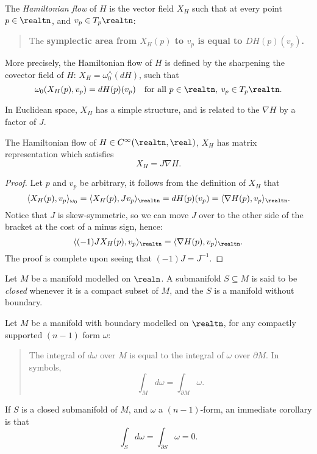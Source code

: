 \documentclass[../main-v2-manifolds.tex]{subfiles}
\begin{document}
\begin{definition}
    The \emph{Hamiltonian flow} of $H$ is the vector field $X_H$ such that at every point $p\in \realtn$, and $v_p\in T_p\realtn$:
    \begin{quote}
        The \textbf{symplectic area from $X_H(p)$ to $v_p$ is equal to $DH(p)(v_p)$.}
    \end{quote}
    More precisely, the Hamiltonian flow of $H$ is defined by the sharpening the covector field of $H$:  $X_H = \omega_0^{\wedge}(dH)$, such that
    \begin{equation}
        \omega_0(X_H(p), v_p) = dH(p)(v_p)\quad\text{for all }p\in \realtn,\: v_p\in T_p\realtn.
        \label{eq:hamiltonian flow definition symplectic pairing}
    \end{equation}
\end{definition}
In Euclidean space, $X_H$ has a simple structure, and is related to the $\nabla H$ by a factor of $J$. 
\begin{lemma}\label{lem:hvf in euclidean space formula}
    The Hamiltonian flow of $H\in C^\infty(\realtn,\real)$, $X_H$ has matrix representation which satisfies
    \begin{equation}
        X_H = J\nabla H.
        \label{eq: hvf in euclidean space formula}
    \end{equation}
\end{lemma}
\begin{proof}
    Let $p$ and $v_p$ be arbitrary, it follows from the definition of $X_H$ that
    \[
        \langle X_H(p), v_p\rangle_{\omega_0} = \langle X_H(p), Jv_p\rangle_{\realtn} = dH(p)(v_p) = \langle\nabla H(p), v_p\rangle_{\realtn}.
    \]
    Notice that $J$ is skew-symmetric, so we can move $J$ over to the other side of the bracket at the cost of a minus sign, hence:
    \[
        \langle (-1)J X_H(p), v_p\rangle_{\realtn} = \langle \nabla H(p),v_p\rangle_{\realtn}.
    \]
    The proof is complete upon seeing that $(-1)J=J^{-1}$.
\end{proof}
\begin{definition}\label{def:closed-submanifolds}
    Let $M$ be a manifold modelled on $\realn$. A submanifold $S\subseteq M$ is said to be \emph{closed} whenever it is a compact subset of $M$, and the $S$ is a manifold without boundary.
\end{definition}
\begin{remark}
    Let $M$ be a manifold with boundary modelled on $\realtn$, for any compactly supported $(n-1)$ form $\omega$:
    \begin{quote}
        The integral of $d\omega$ over $M$ is equal to the integral of $\omega$ over $\partial M$. In symbols,
        \[\int_{M}d\omega = \int_{\partial M}\omega.\]
    \end{quote}
    If $S$ is a closed submanifold of $M$, and $\omega$ a $(n-1)$-form, an immediate corollary is that
    \[\int_S d\omega = \int_{\partial S}\omega = 0.\]
\end{remark}
\end{document}
